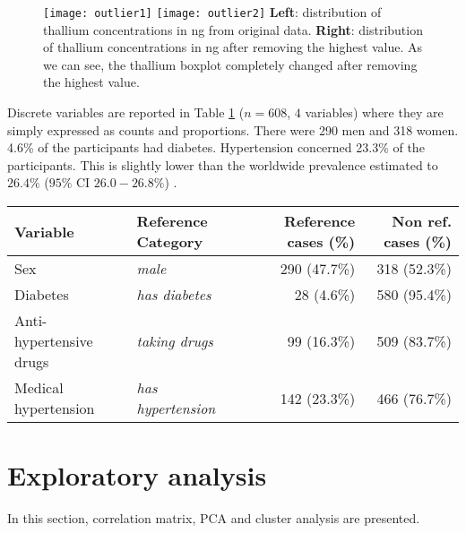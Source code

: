 \begin{figure}
\captionsetup{singlelinecheck = false, format= hang, justification=raggedright, font=small, labelsep=space}
\texttt{[image: outlier1]} \hfill
\texttt{[image: outlier2]} 
\label{fig:Tl_eo}
{\footnotesize \textbf{Left}: distribution of thallium concentrations in ng from original data. \textbf{Right}: distribution of thallium concentrations in ng after removing the highest value. As we can see, the thallium boxplot completely changed after removing the highest value.}
\end{figure}

Discrete variables are reported in Table \ref{table:des_cat} ($n=608$, $4$ variables) where they are simply expressed as counts and proportions. There were 290 men and 318 women. 4.6\% of the participants had diabetes. Hypertension concerned 23.3\% of the participants. This is slightly lower than the worldwide prevalence estimated to $26.4\%$ ($95\% \text{ CI } 26.0-26.8\%$) \cite{kearney_global_2005}.

\begin{table}
\centering
{}
\begin{adjustbox}{max width = 14cm}
\begin{tabular}{llrr}
\toprule
Variable & Reference Category & Reference cases (\%) & Non ref. cases (\%) \\
\midrule
Sex	& \emph{male} &  290 (47.7\%) &  318 (52.3\%) \\
Diabetes & \emph{has diabetes} & 28 \hspace{1pt} (4.6\%) & 580 (95.4\%) \\
Anti-hypertensive drugs & \emph{taking drugs} & 99 (16.3\%) & 509 (83.7\%) \\
Medical hypertension & \emph{has hypertension} & 142 (23.3\%) & 466 (76.7\%) \\
\bottomrule
\end{tabular}
\end{adjustbox}
\label{table:des_cat}
\end{table}

\section{Exploratory analysis}

In this section, correlation matrix, PCA and cluster analysis are presented.

